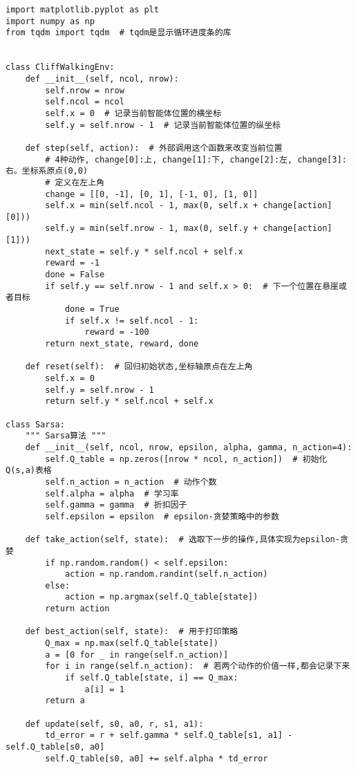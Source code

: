 \begin{lstlisting}
import matplotlib.pyplot as plt
import numpy as np
from tqdm import tqdm  # tqdm是显示循环进度条的库


class CliffWalkingEnv:
    def __init__(self, ncol, nrow):
        self.nrow = nrow
        self.ncol = ncol
        self.x = 0  # 记录当前智能体位置的横坐标
        self.y = self.nrow - 1  # 记录当前智能体位置的纵坐标

    def step(self, action):  # 外部调用这个函数来改变当前位置
        # 4种动作, change[0]:上, change[1]:下, change[2]:左, change[3]:右。坐标系原点(0,0)
        # 定义在左上角
        change = [[0, -1], [0, 1], [-1, 0], [1, 0]]
        self.x = min(self.ncol - 1, max(0, self.x + change[action][0]))
        self.y = min(self.nrow - 1, max(0, self.y + change[action][1]))
        next_state = self.y * self.ncol + self.x
        reward = -1
        done = False
        if self.y == self.nrow - 1 and self.x > 0:  # 下一个位置在悬崖或者目标
            done = True
            if self.x != self.ncol - 1:
                reward = -100
        return next_state, reward, done

    def reset(self):  # 回归初始状态,坐标轴原点在左上角
        self.x = 0
        self.y = self.nrow - 1
        return self.y * self.ncol + self.x

class Sarsa:
    """ Sarsa算法 """
    def __init__(self, ncol, nrow, epsilon, alpha, gamma, n_action=4):
        self.Q_table = np.zeros([nrow * ncol, n_action])  # 初始化Q(s,a)表格
        self.n_action = n_action  # 动作个数
        self.alpha = alpha  # 学习率
        self.gamma = gamma  # 折扣因子
        self.epsilon = epsilon  # epsilon-贪婪策略中的参数

    def take_action(self, state):  # 选取下一步的操作,具体实现为epsilon-贪婪
        if np.random.random() < self.epsilon:
            action = np.random.randint(self.n_action)
        else:
            action = np.argmax(self.Q_table[state])
        return action

    def best_action(self, state):  # 用于打印策略
        Q_max = np.max(self.Q_table[state])
        a = [0 for _ in range(self.n_action)]
        for i in range(self.n_action):  # 若两个动作的价值一样,都会记录下来
            if self.Q_table[state, i] == Q_max:
                a[i] = 1
        return a

    def update(self, s0, a0, r, s1, a1):
        td_error = r + self.gamma * self.Q_table[s1, a1] - self.Q_table[s0, a0]
        self.Q_table[s0, a0] += self.alpha * td_error


\end{lstlisting}
